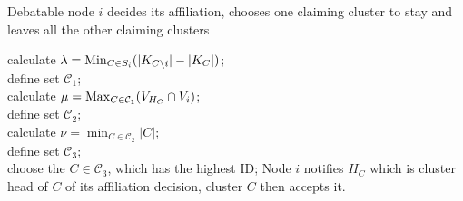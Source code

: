 \begin{algorithm}               %
\caption{Debatable node $i$ decides its affiliation, chooses one claiming cluster to stay and leaves all the other claiming clusters}          %
\label{alg4}
\DontPrintSemicolon
\SetAlgoLined
{}
calculate $\lambda = \operatorname*{Min}_{C\in S_i}(|K_{C\setminus i}|-|K_C|)$;\\
define set $\mathcal{C}_1$;\\	
{
calculate $\mu= \operatorname*{Max}_{C\in \mathcal{C}_1}(V_{H_C}\cap V_i)$;\\
define set $\mathcal{C}_2$;\\	
	{
	calculate $\nu=\min_{C\in \mathcal{C}_2}|C|$;\\
	define set $\mathcal{C}_3$;\\	
		{choose the $C\in \mathcal{C}_3$, which has the highest ID;
		}
	}
}
Node $i$ notifies $H_C$ which is cluster head of $C$ of its affiliation decision, cluster $C$ then accepts it.

\end{algorithm}



